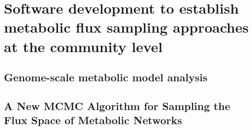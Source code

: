 % 
% 

\chapter{Software development to establish metabolic flux sampling 
         approaches at the community level}
\label{cha:dingo}


\section{Genome-scale metabolic model analysis}



\section{A New MCMC Algorithm for Sampling the Flux Space of Metabolic Networks}







